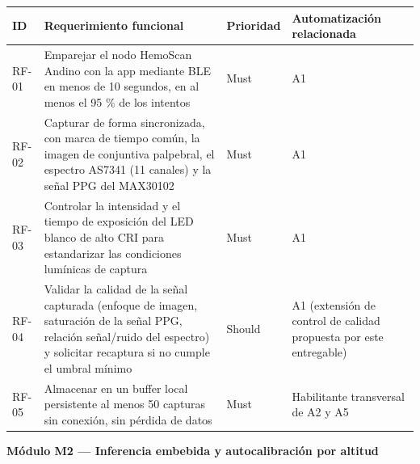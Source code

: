 \documentclass[11pt,a4paper]{article}
\begin{document}
{\small
\begin{longtable}[]{@{}
  >{\raggedright\arraybackslash}p{}
  >{\raggedright\arraybackslash}p{}
  >{\raggedright\arraybackslash}p{}
  >{\raggedright\arraybackslash}p{}@{}}
\toprule\noalign{}
\begin{minipage}[b]{\linewidth}\raggedright
ID
\end{minipage} & \begin{minipage}[b]{\linewidth}\raggedright
Requerimiento funcional
\end{minipage} & \begin{minipage}[b]{\linewidth}\raggedright
Prioridad
\end{minipage} & \begin{minipage}[b]{\linewidth}\raggedright
Automatización relacionada
\end{minipage} \\
\midrule\noalign{}
\endhead
\bottomrule\noalign{}
\endlastfoot
RF-01 & Emparejar el nodo HemoScan Andino con la app mediante BLE en menos de 10 segundos, en al menos el 95 \% de los intentos & Must & A1 \\
RF-02 & Capturar de forma sincronizada, con marca de tiempo común, la imagen de conjuntiva palpebral, el espectro AS7341 (11 canales) y la señal PPG del MAX30102 & Must & A1 \\
RF-03 & Controlar la intensidad y el tiempo de exposición del LED blanco de alto CRI para estandarizar las condiciones lumínicas de captura & Must & A1 \\
RF-04 & Validar la calidad de la señal capturada (enfoque de imagen, saturación de la señal PPG, relación señal/ruido del espectro) y solicitar recaptura si no cumple el umbral mínimo & Should & A1 (extensión de control de calidad propuesta por este entregable) \\
RF-05 & Almacenar en un buffer local persistente al menos 50 capturas sin conexión, sin pérdida de datos & Must & Habilitante transversal de A2 y A5 \\
\end{longtable}
}

\textbf{Módulo M2 --- Inferencia embebida y autocalibración por altitud}
\end{document}

